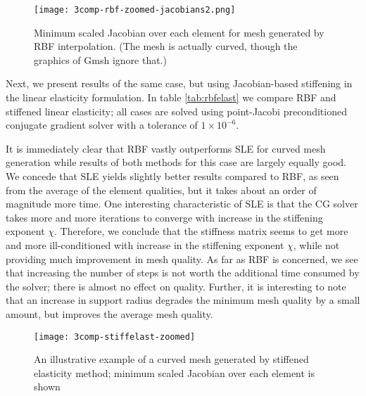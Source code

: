  \begin{figure}
 	\centering
 	\texttt{[image: 3comp-rbf-zoomed-jacobians2.png]}
 	\caption{Minimum scaled Jacobian over each element for mesh generated by RBF interpolation. (The mesh is actually curved, though the graphics of Gmsh ignore that.)}
 	\label{fig:rbf-jacobians}
 \end{figure}

Next, we present results of the same case, but using Jacobian-based stiffening in the linear elasticity formulation. In table \ref{tab:rbfelast} we compare RBF and stiffened linear elasticity; all cases are solved using point-Jacobi preconditioned conjugate gradient solver with a tolerance of $1\times 10^{-6}$.

It is immediately clear that RBF vastly outperforms SLE for curved mesh generation while results of both methods for this case are largely equally good. We concede that SLE yields slightly better results compared to RBF, as seen from the average of the element qualities, but it takes about an order of magnitude more time. One interesting characteristic of SLE is that the CG solver takes more and more iterations to converge with increase in the stiffening exponent $\chi$. Therefore, we conclude that the stiffness matrix seems to get more and more ill-conditioned with increase in the stiffening exponent $\chi$, while not providing much improvement in mesh quality. As far as RBF is concerned, we see that increasing the number of steps is not worth the additional time consumed by the solver; there is almost no effect on quality. Further, it is interesting to note that an increase in support radius degrades the minimum mesh quality by a small amount, but improves the average mesh quality.

\begin{figure}
 	\centering
 	\texttt{[image: 3comp-stiffelast-zoomed]}
 	\caption{An illustrative example of a curved mesh generated by stiffened elasticity method; minimum scaled Jacobian over each element is shown}
 	\label{fig:3compstiffelast}
\end{figure}

